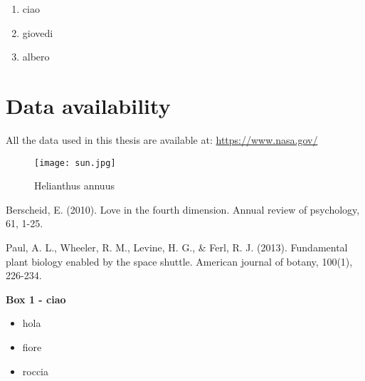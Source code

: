 \documentclass[12pt]{article} %
\begin{document}
\begin{enumerate}
    \item  ciao
    \item giovedi
    \item albero
\end{enumerate}

\section{Data availability}
All the data used in this thesis are available at:
\url{https://www.nasa.gov/} %

\newpage %
\begin{figure}
    \centering %
    \texttt{[image: sun.jpg]}  %
    \caption{Helianthus annuus} %
    \label{sun}
\end{figure}

\begin{thebibliography}{999} %
    Berscheid, E. (2010). Love in the fourth dimension. Annual review of psychology, 61, 1-25. %

Paul, A. L., Wheeler, R. M., Levine, H. G., \& Ferl, R. J. (2013). Fundamental plant biology enabled by the space shuttle. American journal of botany, 100(1), 226-234.
\end{thebibliography} 

\newpage
\bigskip
\hline
\textbf{Box 1 - ciao}
\bigskip
\hline %

\begin{itemize}
\item hola
\item fiore
\item roccia
\end{itemize}
\bigskip
\hline
\end{document}

